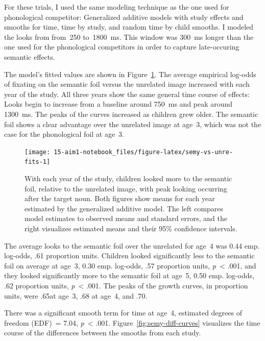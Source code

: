 \documentclass [11pt, proquest] {uwthesis}[2015/03/03]
\begin{document}
For these trials, I used the same modeling technique as the one used for
phonological competitor: Generalized additive models with study effects
and smooths for time, time by study, and random time by child smooths. I
modeled the looks from from~250 to~1800~ms. This window was 300~ms
longer than the one used for the phonological competitors in order to
capture late-occuring semantic effects.

The model's fitted values are shown in
Figure~\ref{fig:semy-vs-unre-fits}. The average empirical log-odds of
fixating on the semantic foil versus the unrelated image increased with
each year of the study. All three years show the same general time
course of effects: Looks begin to increase from a baseline around 750~ms
and peak around 1300~ms. The peaks of the curves increased as children
grew older. The semantic foil shows a clear advantage over the unrelated
image at age~3, which was not the case for the phonological foil at
age~3.







\begin{figure}
\texttt{[image: 15-aim1-notebook\_files/figure-latex/semy-vs-unre-fits-1]} \caption{With each year of the study, children looked
more to the semantic foil, relative to the unrelated image, with peak
looking occurring after the target noun. Both figures show means for
each year estimated by the generalized additive model. The left compares
model estimates to observed means and standard errors, and the right
visualizes estimated means and their 95\% confidence intervals.}\label{fig:semy-vs-unre-fits}
\end{figure}
The average looks to the semantic foil over the unrelated for age~4 was
0.44 emp. log-odds, .61 proportion units. Children looked significantly
less to the semantic foil on average at age~3, 0.30 emp. log-odds, .57
proportion units, \emph{p}~\textless{} .001, and they looked
significantly more to the semantic foil at age~5, 0.50 emp. log-odds,
.62 proportion units, \emph{p}~\textless{} .001. The peaks of the growth
curves, in proportion units, were .65at age~3, .68 at age~4, and .70.

There was a significant smooth term for time at age~4, estimated degrees
of freedom (EDF)~= 7.04, \emph{p}~\textless{} .001.
Figure~\ref{fig:semy-diff-curves} visualizes the time course of the
differences between the smooths from each study.
\end{document}
